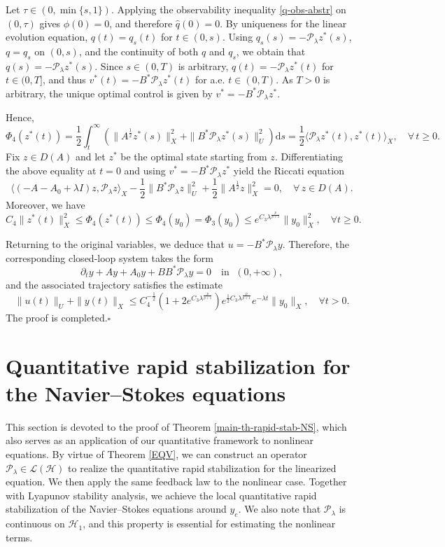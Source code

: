 \documentclass[a4paper]{article}
\numberwithin{equation}{section}
\begin{document}
Let $\tau\in(0,\min\{s,1\})$. Applying the observability inequality
\eqref{q-obs-abstr} on $(0,\tau)$ gives $\phi(0)=0$, and therefore $\widehat q(0)=0$. By uniqueness for the linear evolution equation, $q(t)=q_s(t)$ for $t\in(0,s)$. Using $q_s(s)=-\mathcal P_\lambda z^*(s)$, $q=q_s$ on $(0,s)$, and the continuity of both $q$ and $q_s$, we obtain that
$q(s)=-\mathcal P_\lambda z^*(s)$. Since $s\in(0,T)$ is arbitrary,
$q(t)=-\mathcal P_\lambda z^*(t)$ for $t\in(0,T]$, and thus $v^*(t)=-B^*\mathcal P_\lambda z^*(t)$ for a.e. $t\in(0,T)$. As $T>0$ is arbitrary, the unique optimal control is given by
$v^*=-B^*\mathcal P_\lambda z^*$.

Hence,
$$\Phi_4(z^*(t))=\frac12\int_t^\infty\left(\|A^{\frac 12} z^*(s)\|_{X}^2+\|B^*\mathcal P_\lambda z^*(s)\|_{U}^2\right)\mathrm{d}s=\frac{1}{2}\langle\mathcal{P}_\lambda z^*(t),z^*(t)\rangle_X,\quad \forall\,t\ge0.$$
Fix $z\in D(A)$ and let $z^*$ be the optimal
state starting from $z$. Differentiating the above equality at $t=0$ and using $v^*=-B^*\mathcal P_\lambda z^*$ yield the Riccati equation
$$\langle (-A-A_0+\lambda I)z,\mathcal P_\lambda z\rangle_X-\frac12\|B^*\mathcal P_\lambda z\|_U^2+\frac12\|A^{\frac12}z\|_X^2=0,\quad\forall\,z\in D(A).$$
Moreover, we have
$$C_4\|z^*(t)\|_X^2\le \Phi_4(z^*(t))\le \Phi_4(y_0)=\Phi_3(y_0)\le e^{C_3\lambda^{\frac{p}{p+1}}}\|y_0\|_X^2,\quad \forall t\ge 0.$$

Returning to the original variables, we deduce that
$u=-B^*\mathcal P_\lambda y$. Therefore, the corresponding closed-loop system takes the form
$$\partial_t y+Ay+A_0y+BB^*\mathcal P_\lambda y=0\quad\text{in } \; (0,+\infty),$$
and the associated trajectory satisfies the estimate
$$\|u(t)\|_U+\|y(t)\|_X\le C_4^{-\frac 12}(1+2e^{C_3\lambda^{\frac{p}{p+1}}})e^{\frac 12C_3\lambda^{\frac{p}{p+1}}}e^{-\lambda t}\|y_0\|_X,\quad \forall t>0.$$
The proof is completed.\hfill$\square$


\section{Quantitative rapid stabilization for the Navier--Stokes equations}\label{NS-QRS-SEC}
This section is devoted to the proof of Theorem \ref{main-th-rapid-stab-NS}, which also serves as an application of our quantitative framework to nonlinear equations. By virtue of Theorem \ref{EQV}, we can construct an operator $\mathcal P_\lambda\in\mathcal L(\mathcal H)$ to realize the quantitative rapid stabilization for the linearized equation. We then apply the same feedback law to the nonlinear case. Together with Lyapunov stability analysis, we achieve the local quantitative rapid stabilization of the Navier--Stokes equations around $ y_e$. We also note that $\mathcal{P}_\lambda$ is continuous on $\mathcal{H}_1$, and this property is essential for estimating the nonlinear terms.\\[-2mm] 
\end{document}

